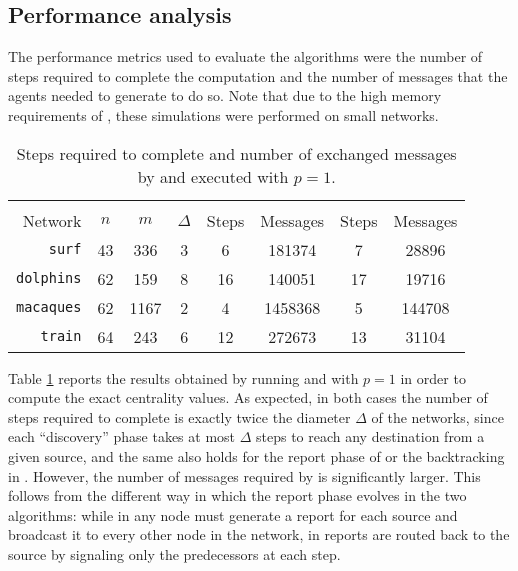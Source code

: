 \subsection{Performance analysis}

The performance metrics used to evaluate the algorithms were the number of steps required to complete the computation and the number of messages that the agents needed to generate to do so. Note that due to the high memory requirements of \deccen{}, these simulations were performed on small networks.

\begin{table}
\centering

\begin{tabular}{r c c c c c c c}
\toprule
 & & & & \multicolumn{2}{c}{\deccen{}} & \multicolumn{2}{c}{\multibfs{}} \\ \cmidrule(lr){5-6} \cmidrule(lr){7-8} 

Network           & $n$ & $m$  & $\Delta$ & Steps  & Messages & Steps & Messages \\ \midrule

\texttt{surf}     & 43  & 336  & 3        & 6      & 181374  & 7     & 28896 \\
\texttt{dolphins} & 62  & 159  & 8        & 16     & 140051   & 17    & 19716 \\
\texttt{macaques}  & 62  & 1167 & 2        & 4      & 1458368  & 5     & 144708 \\
\texttt{train}    & 64  & 243  & 6        & 12     & 272673  & 13    & 31104 \\
 
\bottomrule

\end{tabular}

\caption{Steps required to complete and number of exchanged messages by \deccen{} and \multibfs{} executed with $p=1$.}

\label{table:comparison}

\end{table}

Table \ref{table:comparison} reports the results obtained by running \deccen{} and \multibfs{} with $p = 1$ in order to compute the exact centrality values. As expected, in both cases the number of steps required to complete is exactly twice the diameter $\Delta$ of the networks, since each ``discovery'' phase takes at most $\Delta$ steps to reach any destination from a given source, and the same also holds for the report phase of \deccen{} or the backtracking in \multibfs{}. However, the number of messages required by \deccen{} is significantly larger. This follows from the different way in which the report phase evolves in the two algorithms: while in \deccen{} any node must generate a report for each source and broadcast it to every other node in the network, in \multibfs{} reports are routed back to the source by signaling only the predecessors at each step.



